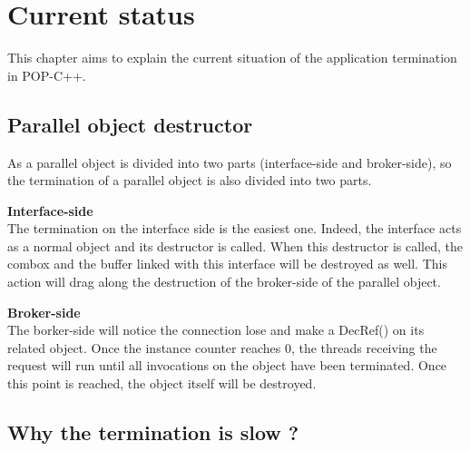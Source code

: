 \section{Current status}
\label{currentstatus}
This chapter aims to explain the current situation of the application termination in POP-C++. 

\subsection{Parallel object destructor}
As a parallel object is divided into two parts (interface-side and broker-side), so the termination of a parallel object is also divided into two parts. \s

\textbf{Interface-side}\\
The termination on the interface side is the easiest one. Indeed, the interface acts as a normal object and its destructor is called. When this destructor is called, the combox and the buffer linked with this interface will be destroyed as well. This action will drag along the destruction of the broker-side of the parallel object. \s

\textbf{Broker-side}\\
The borker-side will notice the connection lose and make a DecRef() on its related object. Once the instance counter reaches 0, the threads receiving the request will run until all invocations on the object have been terminated. Once this point is reached, the object itself will be destroyed. 

\subsection{Why the termination is slow ?}
